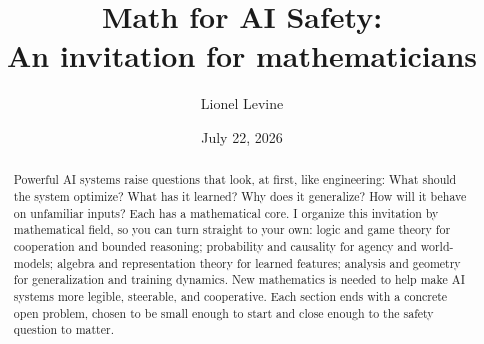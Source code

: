 \documentclass[11pt,reqno]{amsart}
\title[Math for AI Safety]{Math for AI Safety: \\ An invitation for mathematicians}
\author{Lionel Levine}
\date{July 22, 2026}
\theoremstyle{plain}
\theoremstyle{definition}
\begin{document}
\begin{abstract}
Powerful AI systems raise questions that look, at first, like engineering: What should the system optimize? What has it learned? Why does it generalize? How will it behave on unfamiliar inputs? Each has a mathematical core. I organize this invitation by mathematical field, so you can turn straight to your own: logic and game theory for cooperation and bounded reasoning; probability and causality for agency and world-models; algebra and representation theory for learned features; analysis and geometry for generalization and training dynamics. New mathematics is needed to help make AI systems more legible, steerable, and cooperative. Each section ends with a concrete open problem, chosen to be small enough to start and close enough to the safety question to matter.
\end{abstract}

\maketitle







\end{document}
